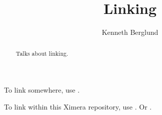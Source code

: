 \documentclass{ximera}
\title{Linking}
\author{Kenneth Berglund}
\begin{document}
\begin{abstract}
Talks about linking. 
\end{abstract}
\maketitle

To link somewhere, use .

To link within this Ximera repository, use . Or .
\end{document}
